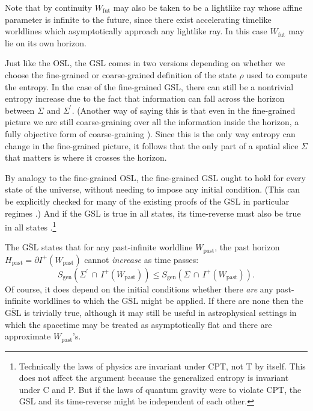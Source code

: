 \documentclass[12pt]{article}
\begin{document}
Note that by continuity $W_\mathrm{fut}$ may also be taken to be a lightlike ray whose affine parameter is infinite to the future, since there exist accelerating timelike worldlines which asymptotically approach any lightlike ray.  In this case $W_\mathrm{fut}$ may lie on its own horizon.

Just like the OSL, the GSL comes in two versions depending on whether we choose the fine-grained or coarse-grained definition of the state $\rho$ used to compute the entropy.  In the case of the fine-grained GSL, there can still be a nontrivial entropy increase due to the fact that information can fall across the horizon between $\Sigma$ and $\Sigma^\prime$.  (Another way of saying this is that even in the fine-grained picture we are still coarse-graining over all the information inside the horizon, a fully objective form of coarse-graining \cite{sorkin10theses}).  Since this is the only way entropy can change in the fine-grained picture, it follows that the only part of a spatial slice $\Sigma$ that matters is where it crosses the horizon.

By analogy to the fine-grained OSL, the fine-grained GSL ought to hold for every state of the universe, without needing to impose any initial condition.  (This can be explicitly checked for many of the existing proofs of the GSL in particular regimes \cite{10proofs, myproofs}.)  And if the GSL is true in all states, its time-reverse must also be true in all states \cite{anec}.\footnote{Technically the laws of physics are invariant under CPT, not T by itself.  This does not affect the argument because the generalized entropy is invariant under C and P.  But if the laws of quantum gravity were to violate CPT, the GSL and its time-reverse might be independent of each other.}
  
The $\overline{\mathrm{GSL}}$ states that for any past-infinite worldline $W_\mathrm{past}$, the past horizon $H_\mathrm{past} = \partial I^+(W_\mathrm{past})$ cannot \emph{increase} as time passes:
\begin{equation}
S_{\mathrm{gen}}(\Sigma^\prime\,\cap\,I^+(W_\mathrm{past})) 
\le S_{\mathrm{gen}}(\Sigma\,\cap\,I^+(W_\mathrm{past})).
\end{equation}
Of course, it does depend on the initial conditions whether there \emph{are} any past-infinite worldlines to which the $\overline{\mathrm{GSL}}$ might be applied.  If there are none then the $\overline{\mathrm{GSL}}$ is trivially true, although it may still be useful in astrophysical settings in which the spacetime may be treated as asymptotically flat and there are approximate $W_\mathrm{past}$'s.
\end{document}
